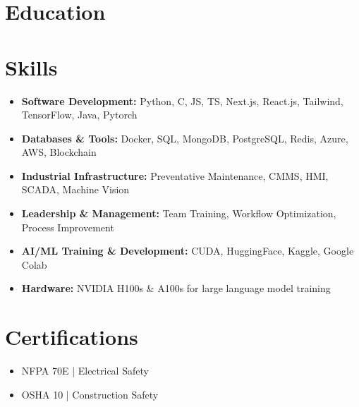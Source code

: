 \documentclass{ExpressiveResume}
\begin{document}
\section{Education}



\section{Skills}

\begin{itemize}
    \item \textbf{Software Development:} Python, C, JS, TS, Next.js, React.js, Tailwind, TensorFlow, Java, Pytorch
    \item \textbf{Databases \& Tools:} Docker, SQL, MongoDB, PostgreSQL, Redis, Azure, AWS, Blockchain
    \item \textbf{Industrial Infrastructure:} Preventative Maintenance, CMMS, HMI, SCADA, Machine Vision
    \item \textbf{Leadership \& Management:} Team Training, Workflow Optimization, Process Improvement
    \item \textbf{AI/ML Training \& Development:} CUDA, HuggingFace, Kaggle, Google Colab
    \item \textbf{Hardware:} NVIDIA H100s \& A100s for large language model training
\end{itemize}

\section{Certifications}

\begin{itemize}
    \item NFPA 70E | Electrical Safety
    \item OSHA 10 | Construction Safety
\end{itemize}
\end{document}
